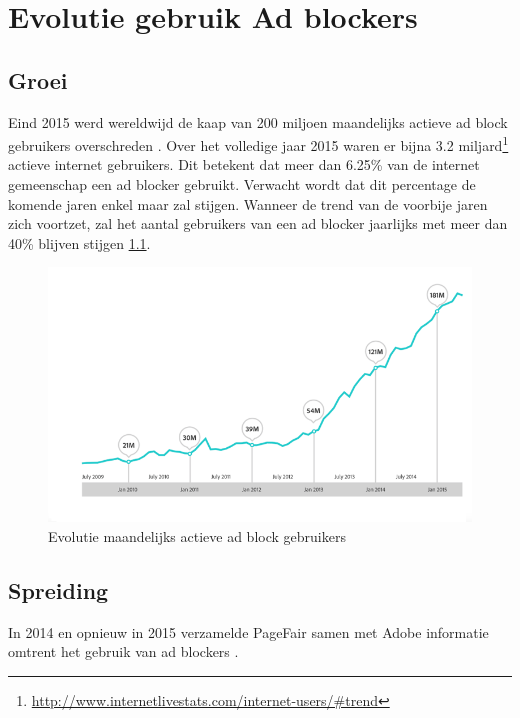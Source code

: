 \documentclass[pdftex,a4paper,12pt,twoside]{report}
\begin{document}
\chapter{Evolutie gebruik Ad blockers}
\label{ch:Evolutie gebruik Ad blockers}

\section{Groei}
\label{sec:Groei}
Eind 2015 werd wereldwijd de kaap van 200 miljoen maandelijks actieve ad block gebruikers overschreden \citep{PageFair2015}. Over het volledige jaar 2015 waren er bijna 3.2 miljard\footnote{\url{ http://www.internetlivestats.com/internet-users/\#trend}} actieve internet gebruikers. Dit betekent dat meer dan 6.25\% van de internet gemeenschap een ad blocker gebruikt. Verwacht wordt dat dit percentage de komende jaren enkel maar zal stijgen. Wanneer de trend van de voorbije jaren zich voortzet, zal het aantal gebruikers van een ad blocker jaarlijks met meer dan 40\% blijven stijgen \ref{fig: adblock-growth}.
\begin{figure}[h!]
\centering
\includegraphics[width=12cm]{img/adblock-growth}
\caption{Evolutie maandelijks actieve ad block gebruikers}
\label{fig: adblock-growth}
\end{figure}



\section{Spreiding}
\label{sec:Spreiding}
In 2014 en opnieuw in 2015 verzamelde PageFair samen met Adobe informatie omtrent het gebruik van ad blockers \citep{PageFair2015,PageFair2014}.
\end{document}
